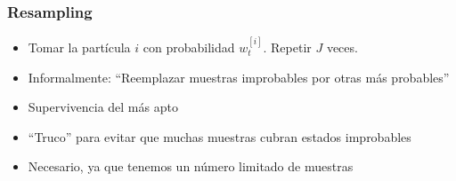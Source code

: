 \begin{frame}
    \frametitle{Resampling}

    \begin{itemize}
        \item Tomar la partícula $i$ con probabilidad $w_t^{[i]}$. Repetir $J$ veces.
        \item Informalmente: ``Reemplazar muestras improbables por otras más probables''
        \item Supervivencia del más apto
        \item ``Truco'' para evitar que muchas muestras cubran estados improbables
        \item Necesario, ya que tenemos un número limitado de muestras
    \end{itemize}
\end{frame}
    
